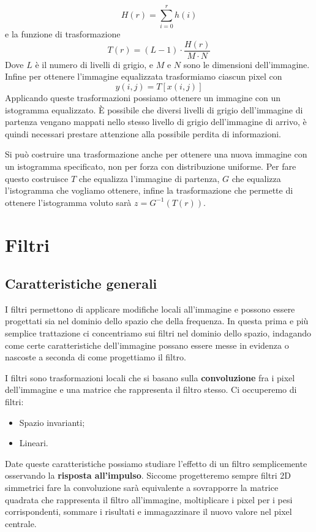 \begin{equation}
	H(r) = \sum_{i = 0}^{r} h(i)
\end{equation}
e la funzione di trasformazione
\begin{equation}
	T(r) = (L - 1) \cdot \frac{H(r)}{M \cdot N}
\end{equation}
Dove $L$ è il numero di livelli di grigio, e $M$ e $N$ sono le dimensioni dell'immagine. Infine per ottenere l'immagine equalizzata trasformiamo ciascun pixel con
\begin{equation}
	y(i,j) = T[x(i,j)]
\end{equation}
Applicando queste trasformazioni possiamo ottenere un immagine con un istogramma equalizzato. È possibile che diversi livelli di grigio dell'immagine di partenza vengano mappati nello stesso livello di grigio dell'immagine di arrivo, è quindi necessari prestare attenzione alla possibile perdita di informazioni.

Si può costruire una trasformazione anche per ottenere una nuova immagine con un istogramma specificato, non per forza con distribuzione uniforme. Per fare questo costruisce $T$ che equalizza l'immagine di partenza, $G$ che equalizza l'istogramma che vogliamo ottenere, infine la trasformazione che permette di ottenere l'istogramma voluto sarà $z = G^{-1}(T(r))$.
\pagebreak
\section{Filtri}
\subsection{Caratteristiche generali}
I filtri permettono di applicare modifiche locali all'immagine e possono essere progettati sia nel dominio dello spazio che della frequenza. In questa prima e più semplice trattazione ci concentriamo sui filtri nel dominio dello spazio, indagando come certe caratteristiche dell'immagine possano essere messe in evidenza o nascoste a seconda di come progettiamo il filtro.

I filtri sono trasformazioni locali che si basano sulla \textbf{convoluzione} fra i pixel dell'immagine e una matrice che rappresenta il filtro stesso. Ci occuperemo di filtri:
\begin{itemize}
	\item Spazio invarianti;
	\item Lineari.
\end{itemize}
Date queste caratteristiche possiamo studiare l'effetto di un filtro semplicemente osservando la \textbf{risposta all'impulso}.  Siccome progetteremo sempre filtri 2D simmetrici fare la convoluzione sarà equivalente a sovrapporre la matrice quadrata che rappresenta il filtro all'immagine, moltiplicare i pixel per i pesi corrispondenti, sommare i risultati e immagazzinare il nuovo valore nel pixel centrale.

